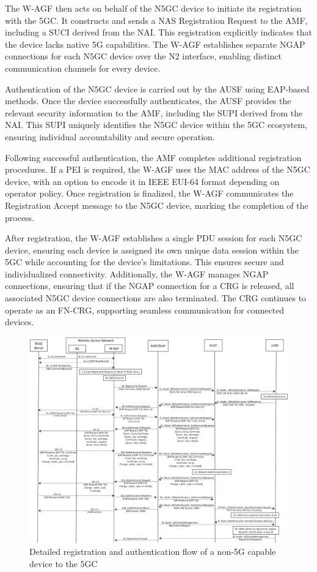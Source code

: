 The W-AGF then acts on behalf of the N5GC device to initiate its registration with the 5GC. It constructs and sends a NAS Registration Request to the AMF, including a SUCI derived from the NAI. This registration explicitly indicates that the device lacks native 5G capabilities. The W-AGF establishes separate NGAP connections for each N5GC device over the N2 interface, enabling distinct communication channels for every device.

Authentication of the N5GC device is carried out by the AUSF using EAP-based methods. Once the device successfully authenticates, the AUSF provides the relevant security information to the AMF, including the SUPI derived from the NAI. This SUPI uniquely identifies the N5GC device within the 5GC ecosystem, ensuring individual accountability and secure operation.

Following successful authentication, the AMF completes additional registration procedures. If a PEI is required, the W-AGF uses the MAC address of the N5GC device, with an option to encode it in IEEE EUI-64 format depending on operator policy. Once registration is finalized, the W-AGF communicates the Registration Accept message to the N5GC device, marking the completion of the process.

After registration, the W-AGF establishes a single PDU session for each N5GC device, ensuring each device is assigned its own unique data session within the 5GC while accounting for the device's limitations. This ensures secure and individualized connectivity. Additionally, the W-AGF manages NGAP connections, ensuring that if the NGAP connection for a CRG is released, all associated N5GC device connections are also terminated. The CRG continues to operate as an FN-CRG, supporting seamless communication for connected devices.

\begin{figure}
    \centering
    \includegraphics[width=0.75\linewidth]{figs/Detailed registration and authentication flow of a non-5G capable device to the 5GC.png}
    \caption{Detailed registration and authentication flow of a non-5G capable device to the 5GC}
    \label{fig:Detailed registration and authentication flow of a non-5G capable device to the 5GC}
\end{figure}


